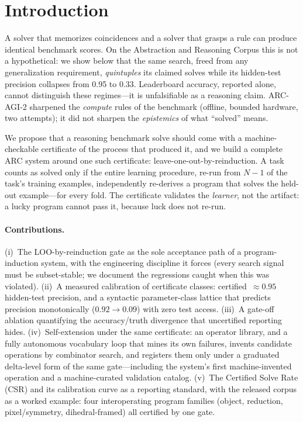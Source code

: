 \documentclass[11pt]{article}
\begin{document}
\section{Introduction}

A solver that memorizes coincidences and a solver that grasps a rule can
produce identical benchmark scores.  On the Abstraction and Reasoning
Corpus this is not a hypothetical: we show below that the same search,
freed from any generalization requirement, \emph{quintuples} its claimed
solves while its hidden-test precision collapses from 0.95 to 0.33.
Leaderboard accuracy, reported alone, cannot distinguish these
regimes---it is unfalsifiable as a reasoning claim.  ARC-AGI-2 sharpened
the \emph{compute} rules of the benchmark (offline, bounded hardware, two
attempts); it did not sharpen the \emph{epistemics} of what ``solved''
means.

We propose that a reasoning benchmark solve should come with a
machine-checkable certificate of the process that produced it, and we build
a complete ARC system around one such certificate:
leave-one-out-by-reinduction.  A task counts as solved only if the entire
learning procedure, re-run from $N{-}1$ of the task's training examples,
independently re-derives a program that solves the held-out example---for
every fold.  The certificate validates the \emph{learner}, not the
artifact: a lucky program cannot pass it, because luck does not re-run.

\paragraph{Contributions.}
(i)~The LOO-by-reinduction gate as the sole acceptance path of a
program-induction system, with the engineering discipline it forces (every
search signal must be subset-stable; we document the regressions caught
when this was violated).
(ii)~A measured calibration of certificate classes:
certified~$\approx 0.95$ hidden-test precision, and a syntactic
parameter-class lattice that predicts precision monotonically
($0.92 \to 0.09$) with zero test access.
(iii)~A gate-off ablation quantifying the accuracy/truth divergence that
uncertified reporting hides.
(iv)~Self-extension under the same certificate: an operator library, and a
fully autonomous vocabulary loop that mines its own failures, invents
candidate operations by combinator search, and registers them only under a
graduated delta-level form of the same gate---including the system's first
machine-invented operation and a machine-curated validation catalog.
(v)~The Certified Solve Rate (CSR) and its calibration curve as a reporting
standard, with the released corpus as a worked example: four
interoperating program families (object, reduction, pixel/symmetry,
dihedral-framed) all certified by one gate.
\end{document}
